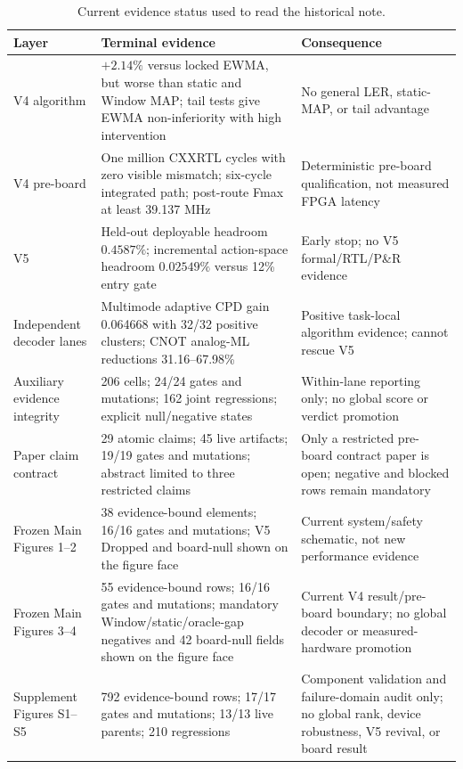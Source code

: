 \documentclass[11pt]{article}
\begin{document}
\begin{table}[htbp]
\centering
\small
\caption{Current evidence status used to read the historical note.}
\label{tab:current-contract-status}
\begin{tabularx}{\textwidth}{@{}l X X@{}}
\toprule
Layer & Terminal evidence & Consequence \\
\midrule
V4 algorithm & $+2.14\%$ versus locked EWMA, but worse than static and Window MAP; tail tests give EWMA non-inferiority with high intervention & No general LER, static-MAP, or tail advantage \\
V4 pre-board & One million CXXRTL cycles with zero visible mismatch; six-cycle integrated path; post-route Fmax at least 39.137 MHz & Deterministic pre-board qualification, not measured FPGA latency \\
V5 & Held-out deployable headroom $0.4587\%$; incremental action-space headroom $0.02549\%$ versus 12\% entry gate & Early stop; no V5 formal/RTL/P\&R evidence \\
Independent decoder lanes & Multimode adaptive CPD gain 0.064668 with 32/32 positive clusters; CNOT analog-ML reductions 31.16--67.98\% & Positive task-local algorithm evidence; cannot rescue V5 \\
Auxiliary evidence integrity & 206 cells; 24/24 gates and mutations; 162 joint regressions; explicit null/negative states & Within-lane reporting only; no global score or verdict promotion \\
Paper claim contract & 29 atomic claims; 45 live artifacts; 19/19 gates and mutations; abstract limited to three restricted claims & Only a restricted pre-board contract paper is open; negative and blocked rows remain mandatory \\
Frozen Main Figures 1--2 & 38 evidence-bound elements; 16/16 gates and mutations; V5 Dropped and board-null shown on the figure face & Current system/safety schematic, not new performance evidence \\
Frozen Main Figures 3--4 & 55 evidence-bound rows; 16/16 gates and mutations; mandatory Window/static/oracle-gap negatives and 42 board-null fields shown on the figure face & Current V4 result/pre-board boundary; no global decoder or measured-hardware promotion \\
Supplement Figures S1--S5 & 792 evidence-bound rows; 17/17 gates and mutations; 13/13 live parents; 210 regressions & Component validation and failure-domain audit only; no global rank, device robustness, V5 revival, or board result \\

\end{tabularx}
\end{table}
\end{document}
